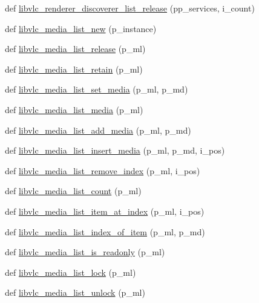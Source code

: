 \begin{DoxyCompactItemize}
\item 
def \hyperlink{namespacevlc_af443e940d4a3485bd04c20d1895b57f7}{libvlc\+\_\+renderer\+\_\+discoverer\+\_\+list\+\_\+release} (pp\+\_\+services, i\+\_\+count)
\item 
def \hyperlink{namespacevlc_ade7073aea18b2eb92b103ed962f73d95}{libvlc\+\_\+media\+\_\+list\+\_\+new} (p\+\_\+instance)
\item 
def \hyperlink{namespacevlc_a45316f80cd7384457137cf0154c99dd7}{libvlc\+\_\+media\+\_\+list\+\_\+release} (p\+\_\+ml)
\item 
def \hyperlink{namespacevlc_a2261e153f34f4ba9fca2040530402c06}{libvlc\+\_\+media\+\_\+list\+\_\+retain} (p\+\_\+ml)
\item 
def \hyperlink{namespacevlc_a0d46d9803abd7e8b6dfca391921dcff0}{libvlc\+\_\+media\+\_\+list\+\_\+set\+\_\+media} (p\+\_\+ml, p\+\_\+md)
\item 
def \hyperlink{namespacevlc_a9057b31381e40f017185409aaf8c8ab7}{libvlc\+\_\+media\+\_\+list\+\_\+media} (p\+\_\+ml)
\item 
def \hyperlink{namespacevlc_a98a21d94dfa80441792c173767f7df39}{libvlc\+\_\+media\+\_\+list\+\_\+add\+\_\+media} (p\+\_\+ml, p\+\_\+md)
\item 
def \hyperlink{namespacevlc_ad202a19648373b42178fdb688b342e63}{libvlc\+\_\+media\+\_\+list\+\_\+insert\+\_\+media} (p\+\_\+ml, p\+\_\+md, i\+\_\+pos)
\item 
def \hyperlink{namespacevlc_a22579a827e1b9e58c69bac7de72b1ab7}{libvlc\+\_\+media\+\_\+list\+\_\+remove\+\_\+index} (p\+\_\+ml, i\+\_\+pos)
\item 
def \hyperlink{namespacevlc_ac1e38d46f64d31d883c7404de7d2fa19}{libvlc\+\_\+media\+\_\+list\+\_\+count} (p\+\_\+ml)
\item 
def \hyperlink{namespacevlc_a80caa9f399a4da1b6c5fd68173fc867b}{libvlc\+\_\+media\+\_\+list\+\_\+item\+\_\+at\+\_\+index} (p\+\_\+ml, i\+\_\+pos)
\item 
def \hyperlink{namespacevlc_a69f02560a16855c9e173826e68abeecb}{libvlc\+\_\+media\+\_\+list\+\_\+index\+\_\+of\+\_\+item} (p\+\_\+ml, p\+\_\+md)
\item 
def \hyperlink{namespacevlc_a3ce52be946efb72c7364aaf27e35d43d}{libvlc\+\_\+media\+\_\+list\+\_\+is\+\_\+readonly} (p\+\_\+ml)
\item 
def \hyperlink{namespacevlc_aec544fc1d8f2faa7ec426291fe7cd3da}{libvlc\+\_\+media\+\_\+list\+\_\+lock} (p\+\_\+ml)
\item 
def \hyperlink{namespacevlc_a6bfee9141e7623012496f9586c55aac6}{libvlc\+\_\+media\+\_\+list\+\_\+unlock} (p\+\_\+ml)

\end{DoxyCompactItemize}
